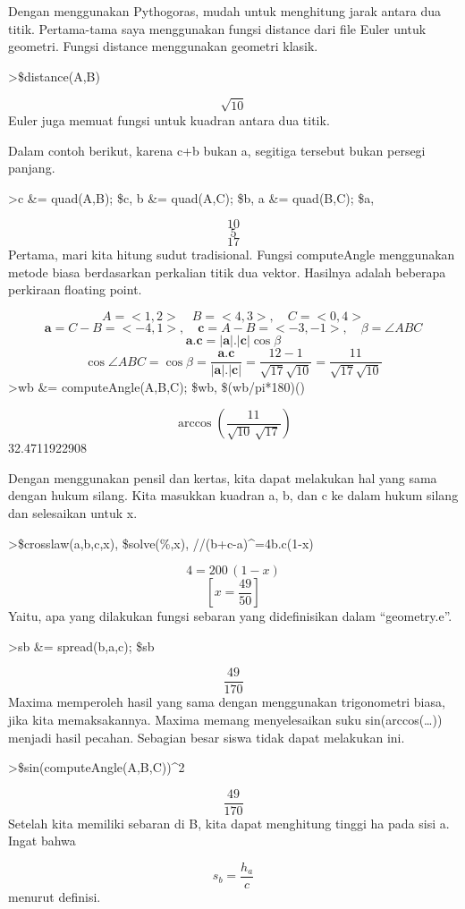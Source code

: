 \documentclass[
]{book}
\begin{document}
Dengan menggunakan Pythogoras, mudah untuk menghitung jarak antara dua titik. Pertama-tama saya menggunakan fungsi distance dari file Euler untuk geometri. Fungsi distance menggunakan geometri klasik.

\textgreater\$distance(A,B)

\[\sqrt{10}\]Euler juga memuat fungsi untuk kuadran antara dua titik.

Dalam contoh berikut, karena c+b bukan a, segitiga tersebut bukan persegi panjang.

\textgreater c \&= quad(A,B); \$c, b \&= quad(A,C); \$b, a \&= quad(B,C); \$a,

\[10\] \[5\] \[17\]Pertama, mari kita hitung sudut tradisional. Fungsi computeAngle menggunakan metode biasa berdasarkan perkalian titik dua vektor. Hasilnya adalah beberapa perkiraan floating point.

\[A=<1,2>\quad B=<4,3>,\quad C=<0,4>\] \[\mathbf{a}=C-B=<-4,1>,\quad \mathbf{c}=A-B=<-3,-1>,\quad \beta=\angle ABC\] \[\mathbf{a}.\mathbf{c}=|\mathbf{a}|.|\mathbf{c}|\cos \beta\] \[\cos \angle ABC =\cos\beta=\frac{\mathbf{a}.\mathbf{c}}{|\mathbf{a}|.|\mathbf{c}|}=\frac{12-1}{\sqrt{17}\sqrt{10}}=\frac{11}{\sqrt{17}\sqrt{10}}\]\textgreater wb \&= computeAngle(A,B,C); \$wb, \$(wb/pi*180)()

\[\arccos \left(\frac{11}{\sqrt{10}\,\sqrt{17}}\right)\] 32.4711922908

Dengan menggunakan pensil dan kertas, kita dapat melakukan hal yang sama dengan hukum silang. Kita masukkan kuadran a, b, dan c ke dalam hukum silang dan selesaikan untuk x.

\textgreater\$crosslaw(a,b,c,x), \$solve(\%,x), //(b+c-a)\^{}=4b.c(1-x)

\[4=200\,\left(1-x\right)\] \[\left[ x=\frac{49}{50} \right]\]Yaitu, apa yang dilakukan fungsi sebaran yang didefinisikan dalam ``geometry.e''.

\textgreater sb \&= spread(b,a,c); \$sb

\[\frac{49}{170}\]Maxima memperoleh hasil yang sama dengan menggunakan trigonometri biasa, jika kita memaksakannya. Maxima memang menyelesaikan suku sin(arccos(\ldots)) menjadi hasil pecahan. Sebagian besar siswa tidak dapat melakukan ini.

\textgreater\$sin(computeAngle(A,B,C))\^{}2

\[\frac{49}{170}\]Setelah kita memiliki sebaran di B, kita dapat menghitung tinggi ha pada sisi a. Ingat bahwa

\[s_b=\frac{h_a}{c}\]menurut definisi.
\end{document}
